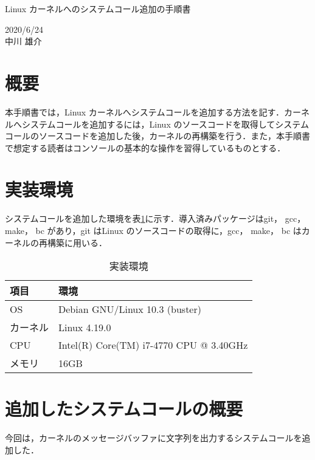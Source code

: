 \documentclass[12pt]{jsarticle}
\begin{document}
\begin{center}
{\LARGE Linux カーネルへのシステムコール追加の手順書}
\end{center}

\begin{flushright}
  2020/6/24\\
  中川 雄介
\end{flushright}
\section{概要}\label{sec:hajime}
\label{sec:introduction}
本手順書では，Linux カーネルへシステムコールを追加する方法を記す．カーネルへシステムコールを追加するには，Linux のソースコードを取得してシステムコールのソースコードを追加した後，カーネルの再構築を行う．また，本手順書で想定する読者はコンソールの基本的な操作を習得しているものとする．

\section{実装環境}\label{sec:env}
システムコールを追加した環境を表\ref{tab:1}に示す．導入済みパッケージはgit， gcc， make， bc があり，git はLinux のソースコードの取得に，gcc， make， bc はカーネルの再構築に用いる．
\begin{table}[h]
  \begin{center}
    \caption{実装環境}\label{tab:1}
    \begin{tabular}{l|l}
      \hline\hline
      \multicolumn{1}{l|}{項目} & \multicolumn{1}{l}{環境}\\
      \hline
      OS & Debian GNU/Linux 10.3 (buster)\\
      カーネル & Linux 4.19.0\\
      CPU & Intel(R) Core(TM) i7-4770 CPU @ 3.40GHz\\
      メモリ & 16GB\\
      \hline
    \end{tabular}
  \end{center}
\end{table}

\section{追加したシステムコールの概要}\label{sec:gaiyou}
今回は，カーネルのメッセージバッファに文字列を出力するシステムコールを追加した．
\end{document}
